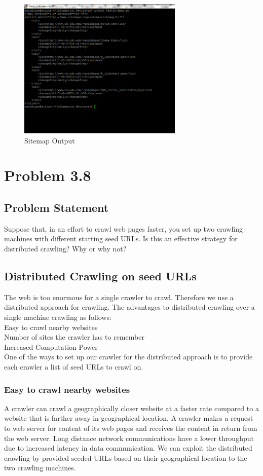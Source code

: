 \documentclass[12pt]{report}
\begin{document}
\begin{figure}[ht]
  \centering
  \includegraphics[width=0.7\textwidth,]{Sitemap_Output.PNG}
  \caption{Sitemap Output}
  \label{fig:10}
\end{figure}

\chapter{Problem 3.8}
\section{Problem Statement}
Suppose that, in an effort to crawl web pages faster, you set up two crawling machines with different starting seed URLs. Is this an effective strategy for distributed crawling? Why or why not?
\section{Distributed Crawling on seed URLs}
The web is too enormous for a single crawler to crawl. Therefore we use a distributed approach for crawling. The advantages to distributed crawling over a single machine crawling as follows:\\
Easy to crawl nearby websites\\
Number of sites the crawler has to remember\\
Increased Computation Power\\
One of the ways to set up our crawler for the distributed approach is to provide each crawler a list of seed URLs to crawl on. 
\subsection{Easy to crawl nearby websites}
 A crawler can crawl a geographically closer website at a faster rate compared to a website that is farther away in geographical location. A crawler makes a request to web server for content of its web pages and receives the content in return from the web server. Long distance network communications have a lower throughput due to increased latency in data communication. We can exploit the distributed crawling by  provided seeded URLs based on their geographical location to  the two crawling machines.
\end{document}
